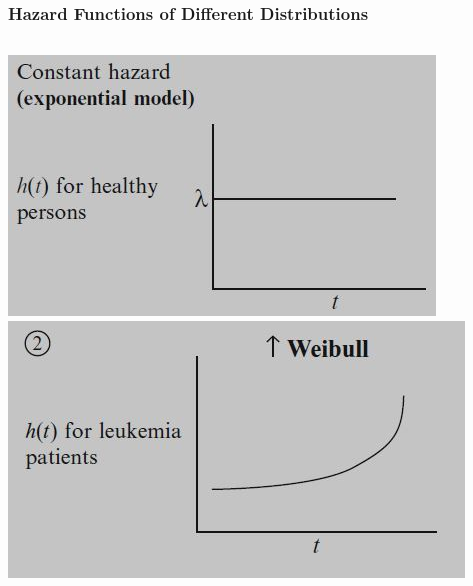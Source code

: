 \documentclass{beamer}
\theoremstyle{definition}
\begin{document}
\begin{frame}\frametitle{Hazard Functions of Different Distributions}
\begin{columns}
    \begin{column}{0.48\textwidth}
        \includegraphics[width = \textwidth]{Hazards1.JPG} \\
           \includegraphics[width = \textwidth]{Hazards2.JPG}
    \end{column}
    \hspace{-10pt}
    \begin{column}{0.48\textwidth}
              \vspace{-20pt}

\end{column}
\end{columns}
\end{frame}
\end{document}
